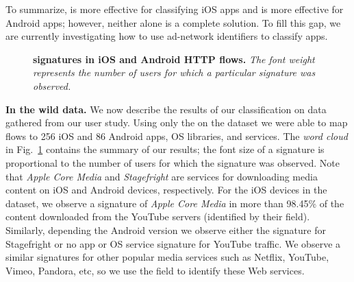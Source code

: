 To summarize, \useragent is more effective for classifying iOS apps and \httphost is more effective for Android apps; however, neither alone is a complete solution. 
To fill this gap, we are currently investigating how to use ad-network identifiers to classify apps. 

\begin{figure}
\newline
{}
\caption{\textbf{\useragent signatures in  iOS and Android HTTP flows.} \emph{The font weight represents the number of users for which a particular signature was observed.}}
\vspace{\postfigspace}
\label{fig:http-wordcloud}
\end{figure}

\textbf{In the wild data.}
We now describe the results of our classification on data gathered from our user study.
Using only the \useragent on the \mobWild dataset we were able to map flows to 256 iOS and 86 Android apps, OS libraries, and services. 
The \emph{word cloud} in Fig.~\ref{fig:http-wordcloud} contains the summary of our results; the font size of a signature is proportional to the number of users for which the signature was observed.
Note that \emph{Apple Core Media} and \emph{Stagefright} are services for downloading media content on iOS and Android devices, respectively.
For the iOS devices in the \mobWild dataset, we observe a signature of \emph{Apple Core Media} in more than 98.45\% of the content downloaded from the YouTube servers (identified by their \httphost field).
Similarly, depending the Android version we observe either the signature for Stagefright or no app or OS service signature for YouTube traffic. %
We observe a similar signatures for other popular media services such as Netflix, YouTube, Vimeo, Pandora, etc, so we use the \httphost field to identify these Web services.


